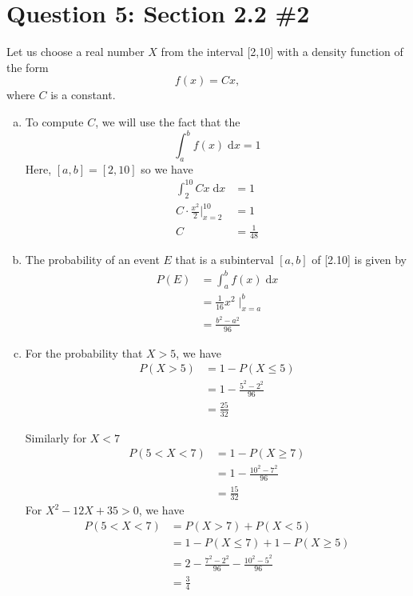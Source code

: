 \documentclass[11pt, oneside]{article}   	%
\begin{document}
\section*{Question 5: Section 2.2 \#2}

Let us choose a real number $X$ from the interval [2,10] with a density function of the form
$$f(x) = Cx,$$
where $C$ is a constant.
\begin{enumerate}[(a)]
	\item To compute $C$, we will use the fact that the 
	$$\int_a^b f(x)  \; \mathrm{d}x = 1$$	
	Here, $[a,b] = [2,10]$ so we have
	\begin{align*}
		\int_2^{10} Cx\;\mathrm{d}x & = 1 \\
		C \cdot \frac{x^2}{2} \Big|_{x=2}^{10} & = 1 \\
		C & = \frac{1}{48}
	\end{align*}
	
	
	\item The probability of an event $E$ that is a subinterval $[a,b]$ of [2.10] is given by
	\begin{align*}
		P(E) & = \int_a^b f(x) \; \mathrm{d}x \\
		& = \frac{1}{16} x^2 \; \Big|_{x=a}^b \\
		& = \frac{b^2-a^2}{96}
	\end{align*}
	
	\item For the probability that $X>5$, we have
	\begin{align*}
		P(X>5) & = 1 - P(X \leq 5) \\
		& = 1 - \frac{5^2-2^2}{96} \\
		& = \frac{25}{32}
	\end{align*}
		
	
	Similarly for $X < 7$
	\begin{align*}
		P(5 < X < 7) & = 1 - P(X \geq 7) \\
		& = 1 - \frac{10^2-7^2}{96} \\
		& = \frac{15}{32}
	\end{align*}
	For $X^2-12X+35>0$, we have
	\begin{align*}
		P(5 < X < 7) & = P(X > 7) + P(X<5) \\
		& = 1 - P(X \leq 7) + 1 - P(X \geq 5) \\
		& = 2 - \frac{7^2-2^2}{96} - \frac{10^2-5^2}{96} \\
		& = \frac{3}{4}
	\end{align*}
\end{enumerate}
\end{document}
